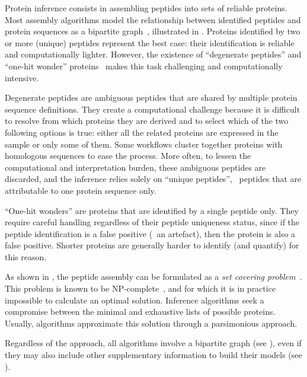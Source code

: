 Protein inference consists
in assembling peptides into sets of reliable proteins.
Most assembly algorithms model
the relationship between identified peptides and protein sequences
as a bipartite graph~, illustrated in .
Proteins identified by two or more (unique) peptides represent the best case:
their identification is reliable and computationally lighter.
However,
the existence of \enquote{degenerate peptides} and
\enquote{one-hit wonder} proteins~ makes
this task challenging and computationally intensive.\mybr\

Degenerate peptides are ambiguous peptides
that are shared by multiple protein sequence definitions.
They create a computational challenge
because it is difficult
to resolve from which proteins they are derived
and to select which of the two following options is true:
either all the related proteins are expressed in the sample
or only some of them.
Some workflows cluster together proteins with homologous sequences
to ease the process.
More often, to lessen the computational and interpretation burden,
these ambiguous peptides are discarded, and
the inference relies solely on \enquote{unique peptides},
\ie\ peptides that are attributable to one protein sequence only.\mybr\

\enquote{One-hit wonders} are proteins
that are identified by a single peptide only.
They require careful handling regardless of their peptide uniqueness status,
since if the peptide identification is a false positive (\ie\ an artefact),
then the protein is also a false positive.
Shorter proteins are generally harder to identify (and quantify)
for this reason.\mybr\

As shown in ,
the peptide assembly can be formulated as
a \emph{set covering problem}~.
This problem is known to be \gls{NP}-complete~,
and for which it is in practice impossible to calculate an optimal solution.
Inference algorithms seek
a compromise between the minimal and exhaustive lists of possible proteins.
Usually, algorithms approximate this solution through a parsimonious approach.\mybr\

Regardless of the approach, all algorithms involve a bipartite graph
(see ),
even if they may also include other supplementary information
to build their models (see ).

